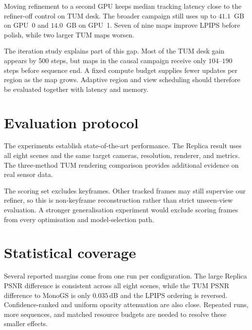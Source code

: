 Moving refinement to a second GPU keeps median tracking latency close to the
refiner-off control on TUM desk. The broader campaign still uses up to
$41.1$~GB on GPU~0 and $14.0$~GB on GPU~1. Seven of nine maps improve LPIPS
before polish, while two larger TUM maps worsen.

The iteration study explains part of this gap. Most of the TUM desk gain
appears by 500 steps, but maps in the causal campaign receive only
$104$--$190$ steps before sequence end. A fixed compute budget supplies fewer
updates per region as the map grows. Adaptive region and view scheduling
should therefore be evaluated together with latency and memory.

\section{Evaluation protocol}

The experiments establish state-of-the-art performance. The Replica result
uses all eight scenes and the same target cameras, resolution, renderer, and
metrics. The three-method TUM rendering comparison provides additional
evidence on real sensor data.

The scoring set excludes keyframes. Other tracked frames may still supervise
our refiner, so this is non-keyframe reconstruction rather than strict
unseen-view evaluation. A stronger generalisation experiment would exclude
scoring frames from every optimisation and model-selection path.

\section{Statistical coverage}

Several reported margins come from one run per configuration. The large
Replica PSNR difference is consistent across all eight scenes, while the
TUM PSNR difference to MonoGS is only $0.035$\,dB and the LPIPS ordering is
reversed. Confidence-ranked and uniform opacity attenuation are also close.
Repeated runs, more sequences, and matched resource budgets are needed to
resolve these smaller effects.
